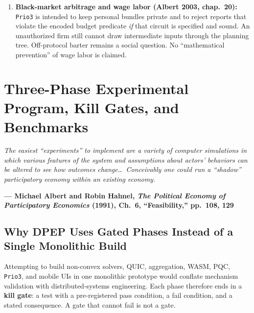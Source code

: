 \documentclass[10pt,twoside,openany]{book}
\theoremstyle{dpepstyle}
\newcommand{\chapterepigraph}[2]{%
  \vspace{-0.4em}
  \begin{FlushRight}
  \begin{minipage}{0.82\textwidth}
    \itshape\small\color{SlateDark} #1\par
    \vspace{3pt}
    \upshape\footnotesize\textbf{--- #2}
  \end{minipage}
  \end{FlushRight}
  \vspace{1em}
}
\newenvironment{FlushRight}{\begin{flushright}}{\end{flushright}}
\begin{document}
\begin{enumerate}[leftmargin=1.8em,itemsep=3pt]
  \item \textbf{Black-market arbitrage and wage labor (Albert 2003, chap.~20):} \texttt{Prio3} is intended to keep personal bundles private and to reject reports that violate the encoded budget predicate \emph{if} that circuit is specified and sound. An unauthorized firm still cannot draw intermediate inputs through the planning tree. Off-protocol barter remains a social question. No ``mathematical prevention'' of wage labor is claimed.
\end{enumerate}

\chapter{Three-Phase Experimental Program, Kill Gates, and Benchmarks}
\label{ch:program}

\chapterepigraph{The easiest ``experiments'' to implement are a variety of computer simulations in which various features of the system and assumptions about actors' behaviors can be altered to see how outcomes change\dots\ Conceivably one could run a ``shadow'' participatory economy within an existing economy.}{Michael Albert and Robin Hahnel, \emph{The Political Economy of Participatory Economics} (1991), Ch.~6, ``Feasibility,'' pp.~108, 129\protect\footnotemark}

\section{Why DPEP Uses Gated Phases Instead of a Single Monolithic Build}

Attempting to build non-convex solvers, QUIC, aggregation, WASM, PQC, \texttt{Prio3}, and mobile UIs in one monolithic prototype would conflate mechanism validation with distributed-systems engineering. Each phase therefore ends in a \textbf{kill gate}: a test with a pre-registered pass condition, a fail condition, and a stated consequence. A gate that cannot fail is not a gate.
\end{document}
